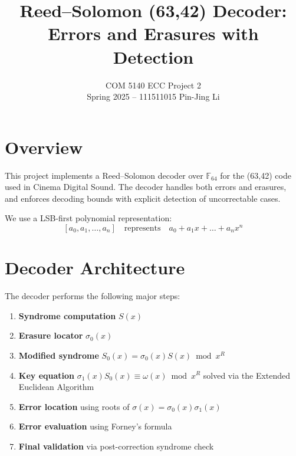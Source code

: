 \documentclass[11pt]{article}
\title{Reed--Solomon (63,42) Decoder: Errors and Erasures with Detection}
\author{COM 5140 ECC Project 2 \\ \small{Spring 2025 -- 111511015 Pin-Jing Li}}
\date{}
\begin{document}
\maketitle

\section{Overview}
This project implements a Reed--Solomon decoder over \( \mathbb{F}_{64} \) for the (63,42) code used in Cinema Digital Sound. The decoder handles both errors and erasures, and enforces decoding bounds with explicit detection of uncorrectable cases.

We use a LSB-first polynomial representation:
\[
[a_0, a_1, \dots, a_n] \quad \text{represents} \quad a_0 + a_1x + \dots + a_nx^n
\]

\section{Decoder Architecture}
The decoder performs the following major steps:
\begin{enumerate}
    \item \textbf{Syndrome computation} \( S(x) \)
    \item \textbf{Erasure locator} \( \sigma_0(x) \)
    \item \textbf{Modified syndrome} \( S_0(x) = \sigma_0(x)S(x) \bmod x^R \)
    \item \textbf{Key equation} \( \sigma_1(x) S_0(x) \equiv \omega(x) \bmod x^R \) solved via the Extended Euclidean Algorithm
    \item \textbf{Error location} using roots of \( \sigma(x) = \sigma_0(x)\sigma_1(x) \)
    \item \textbf{Error evaluation} using Forney’s formula
    \item \textbf{Final validation} via post-correction syndrome check
\end{enumerate}
\end{document}
